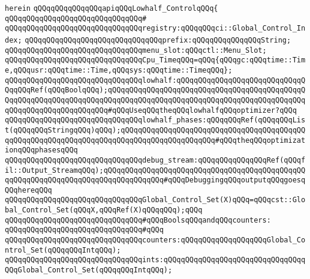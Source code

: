 \verb|herein|\newline
\newline
\verb|qQQqqQQqqQQqqQQqapiqQQqLowhalf_ControlqQQq{|\newline
\verb|qQQqqQQqqQQqqQQqqQQqqQQqqQQqqQQq#|\newline
\verb|qQQqqQQqqQQqqQQqqQQqqQQqqQQqqQQqregistry:qQQqqQQqci::Global_Control_Index;|\newline
\verb|qQQqqQQqqQQqqQQqqQQqqQQqqQQqqQQqprefix:qQQqqQQqqQQqqQQqString;|\newline
\verb|qQQqqQQqqQQqqQQqqQQqqQQqqQQqqQQqmenu_slot:qQQqctl::Menu_Slot;|\newline
\newline
\verb|qQQqqQQqqQQqqQQqqQQqqQQqqQQqqQQqCpu_TimeqQQq=qQQq{qQQqgc:qQQqtime::Time,qQQqusr:qQQqtime::Time,qQQqsys:qQQqtime::TimeqQQq};|\newline
\newline
\verb|qQQqqQQqqQQqqQQqqQQqqQQqqQQqqQQqlowhalf:qQQqqQQqqQQqqQQqqQQqqQQqqQQqqQQqqQQqRef(qQQqBoolqQQq);qQQqqQQqqQQqqQQqqQQqqQQqqQQqqQQqqQQqqQQqqQQqqQQqqQQqqQQqqQQqqQQqqQQqqQQqqQQqqQQqqQQqqQQqqQQqqQQqqQQqqQQqqQQqqQQqqQQqqQQqqQQqqQQqqQQqqQQqqQQq#qQQqUseqQQqtheqQQqlowhalfqQQqoptimizer?qQQq|\newline
\verb|qQQqqQQqqQQqqQQqqQQqqQQqqQQqqQQqlowhalf_phases:qQQqqQQqRef(qQQqqQQqList(qQQqqQQqStringqQQq)qQQq);qQQqqQQqqQQqqQQqqQQqqQQqqQQqqQQqqQQqqQQqqQQqqQQqqQQqqQQqqQQqqQQqqQQqqQQqqQQqqQQqqQQqqQQqqQQq#qQQqtheqQQqoptimizationqQQqphasesqQQq|\newline
\verb|qQQqqQQqqQQqqQQqqQQqqQQqqQQqqQQqdebug_stream:qQQqqQQqqQQqqQQqRef(qQQqfil::Output_StreamqQQq);qQQqqQQqqQQqqQQqqQQqqQQqqQQqqQQqqQQqqQQqqQQqqQQqqQQqqQQqqQQqqQQqqQQqqQQqqQQqqQQqqQQq#qQQqDebuggingqQQqoutputqQQqgoesqQQqhereqQQq|\newline
\newline
\verb|qQQqqQQqqQQqqQQqqQQqqQQqqQQqqQQqGlobal_Control_Set(X)qQQq=qQQqcst::Global_Control_Set(qQQqX,qQQqRef(X)qQQqqQQq);qQQq|\newline
\newline
\verb|qQQqqQQqqQQqqQQqqQQqqQQqqQQqqQQq#qQQqBoolsqQQqandqQQqcounters:|\newline
\verb|qQQqqQQqqQQqqQQqqQQqqQQqqQQqqQQq#qQQq|\newline
\verb|qQQqqQQqqQQqqQQqqQQqqQQqqQQqqQQqcounters:qQQqqQQqqQQqqQQqqQQqGlobal_Control_Set(qQQqqQQqIntqQQq);|\newline
\verb|qQQqqQQqqQQqqQQqqQQqqQQqqQQqqQQqints:qQQqqQQqqQQqqQQqqQQqqQQqqQQqqQQqqQQqGlobal_Control_Set(qQQqqQQqIntqQQq);|\newline
